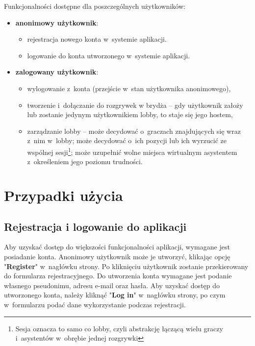 Funkcjonalności dostępne dla poszczególnych użytkowników:
\begin{itemize}
    \item \textbf{anonimowy użytkownik}:
          \begin{itemize}
              \item rejestracja nowego konta w~systemie aplikacji.
              \item logowanie do konta utworzonego w~systemie aplikacji.
          \end{itemize}

    \item \textbf{zalogowany użytkownik}:
          \begin{itemize}
              \item wylogowanie z~konta (przejście w~stan użytkownika anonimowego),
              \item tworzenie i~dołączanie do rozgrywek w brydża --
                    gdy użytkownik założy lub zostanie jedynym
                    użytkownikiem lobby, to staje się jego
                    hostem,
              \item zarządzanie lobby -- może decydować o~graczach znajdujących się wraz
                    z~nim w~lobby; może decydować o~ich pozycji lub ich wyrzucić
                    ze wspólnej sesji\footnote{Sesja oznacza to samo co lobby, czyli
                        abstrakcję łączącą wielu graczy i~asystentów w~obrębie jednej
                        rozgrywki};
                    może uzupełnić wolne miejsca wirtualnym asystentem
                    z~określeniem jego poziomu trudności.
          \end{itemize}
\end{itemize}

\FloatBarrier

\section{Przypadki użycia}

\subsection{Rejestracja i logowanie do aplikacji}

Aby uzyskać dostęp do większości funkcjonalności aplikacji, wymagane
jest posiadanie konta. Anonimowy użytkownik może je utworzyć, klikając
opcję "\textbf{Register}"\xspace w~nagłówku strony. Po kliknięciu użytkownik
zostanie przekierowany do formularza rejestracyjnego.
Do utworzenia konta wymagane jest podanie własnego
pseudonimu, adresu e-mail oraz hasła. Aby uzyskać dostęp do utworzonego
konta, należy kliknąć "\textbf{Log in}"\xspace w~nagłówku strony, po czym
w~formularzu podać dane wykorzystanie podczas rejestracji.

